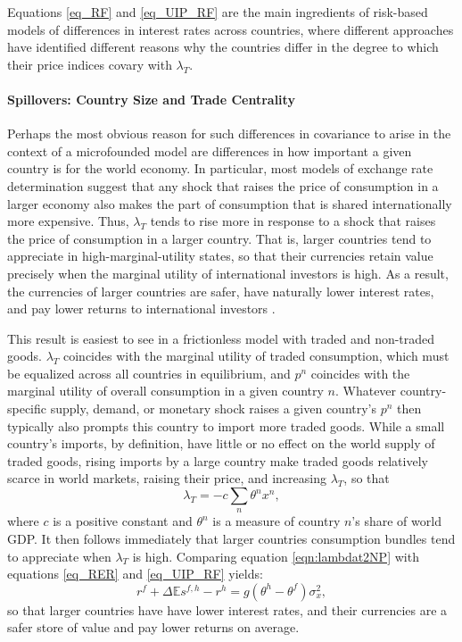 \documentclass{ar-1col}
\begin{document}
Equations \ref{eq_RF} and \ref{eq_UIP_RF} are the main ingredients of risk-based models of differences in interest rates across countries, where different approaches have identified different reasons why the countries differ in the degree to which their price indices covary with $\lambda_T$.

\paragraph*{Spillovers: Country Size and Trade Centrality}

Perhaps the most obvious reason for such differences in covariance to arise in the context of a microfounded model are differences in how important a given country is for the world economy. In particular, most models of exchange rate determination suggest that any shock that raises the price of consumption in a larger economy also makes the part of consumption that is shared internationally more expensive. Thus, $\lambda_T$ tends to rise more in response to a shock that raises the price of consumption in a larger country. That is, larger countries tend to appreciate in high-marginal-utility states, so that their currencies retain value precisely when the marginal utility of international investors is high. As a result, the currencies of larger countries are safer, have naturally lower interest rates, and pay lower returns to international investors \citep{Martin2012, Hassan2013}.

This result is easiest to see in a frictionless model with traded and non-traded goods. $\lambda_T$ coincides with the marginal utility of traded consumption, which must be equalized across all countries in equilibrium, and $p^n$ coincides with the marginal utility of overall consumption in a given country $n$. Whatever country-specific supply, demand, or monetary shock raises a given country's $p^n$ then typically also prompts this country to import more traded goods. While a small country's imports, by definition, have little or no effect on the world supply of traded goods, rising imports by a large country make traded goods relatively scarce in world markets, raising their price, and increasing $\lambda_T$, so that
\begin{equation} \lambda_{T} = -c \sum_{n} \theta^n x^n,
    \label{eqn:lambdat2NP}
\end{equation}
where $c$ is a positive constant and $\theta^n$ is a measure of country $n$'s share of world GDP. It then follows immediately that larger countries consumption bundles tend to appreciate when $\lambda_T$ is high. Comparing equation \ref{eqn:lambdat2NP} with equations \ref{eq_RER} and \ref{eq_UIP_RF} yields:
\begin{equation}
  r^{f} + \Delta \mathbb{E} s^{f, h} - r^{h}
  =g\left(\theta^h - \theta^f\right) \sigma_x^2,
  \label{eq_FF_UIP}
\end{equation}
so that larger countries have have lower interest rates, and their currencies are a safer store of value and pay lower returns on average.
  
\end{document}
